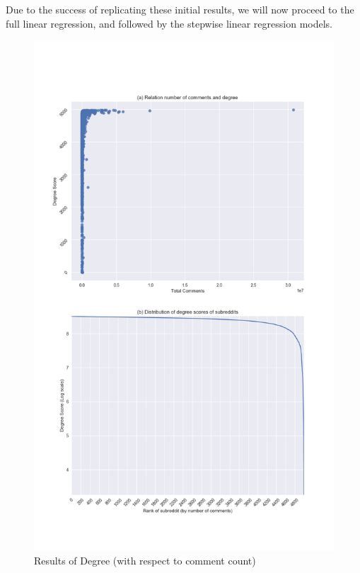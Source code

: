 \documentclass[bsc,frontabs,twoside,singlespacing,parskip,deptreport]{infthesis}
\begin{document}
Due to the success of replicating these initial results, we will now proceed to the full linear regression, and followed by the stepwise linear regression models. 

\begin{figure}[p]
	\centering
  	\includegraphics[width=\textwidth]{degree.png}
  	\caption{Results of Degree (with respect to comment count)}
  	\label{fig:degree}
\end{figure}
\end{document}
